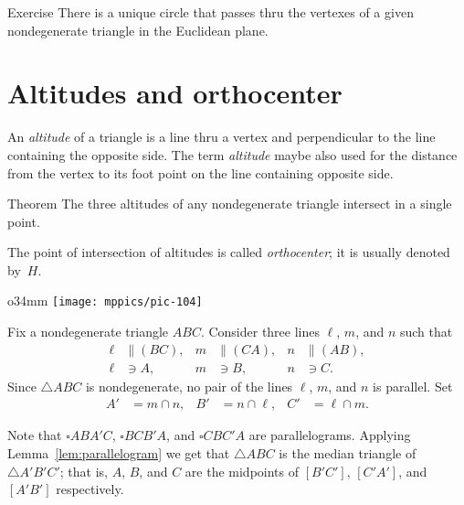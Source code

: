 \begin{thm}{Exercise}\label{ex:unique-cline}
There is a unique circle that passes thru the vertexes of a given nondegenerate triangle in the Euclidean plane. 
\end{thm}




\section*{Altitudes and orthocenter}

An \emph{altitude} of a triangle is a line thru a vertex and perpendicular to the line containing the opposite side.
The term \emph{altitude} maybe also used for the distance from the vertex to its foot point on the line containing opposite side.

\begin{thm}{Theorem}\label{thm:orthocenter}
The three altitudes of any nondegenerate triangle intersect in a single point.
\end{thm}

The point of intersection of altitudes is called \emph{orthocenter}; 
it is usually denoted by~$H$.

{

\begin{wrapfigure}{o}{34mm}
\vskip-4mm
\centering
\texttt{[image: mppics/pic-104]}
\end{wrapfigure}

Fix a nondegenerate triangle $A B C$.
Consider three lines $\ell$, $m$, and $n$
such that 
\begin{align*}
\ell&\parallel(BC),
&
m&\parallel(CA),
&
n&\parallel(AB),
\\
\ell&\ni A,
&
m&\ni B,
&
n&\ni C.
\end{align*}
Since $\triangle A B C$ is nondegenerate,
no pair of the lines $\ell$, $m$, and $n$ is parallel.
Set 
\begin{align*}
A'&=m\cap n,
&
B'&=n\cap \ell,
&
C'&=\ell\cap m.
\end{align*}

}

Note that $\square A B A' C$, $\square B C B' A$, and $\square C B C' A$ are parallelograms.
Applying Lemma~\ref{lem:parallelogram} we get that $\triangle ABC$ is the median triangle of $\triangle A' B' C'$;
that is, $A$, $B$, and $C$ are the midpoints of $[B' C']$, $[C' A']$, and $[A' B']$ respectively.

